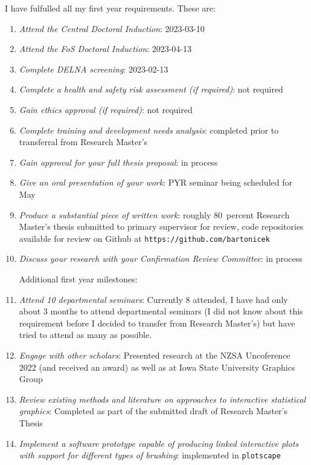 \documentclass[12pt,a4paper]{article}
\begin{document}
I have fulfulled all my first year requirements. These are:

\begin{enumerate}

\item \textit{Attend the Central Doctoral Induction}: 2023-03-10
\item \textit{Attend the FoS Doctoral Induction}: 2023-04-13
\item \textit{Complete DELNA screening}: 2023-02-13
\item \textit{Complete a health and safety risk assessment (if required)}: not required
\item \textit{Gain ethics approval (if required)}: not required
\item \textit{Complete training and development needs analysis}: completed prior to transferral from Research Master's
\item \textit{Gain approval for your full thesis proposal}: in process
\item \textit{Give an oral presentation of your work}: PYR seminar being scheduled for May
\item \textit{Produce a substantial piece of written work}: roughly 80~percent Research Master's thesis submitted to primary supervisor for review, 
code repositories available for review on Github at \texttt{https://github.com/bartonicek}
\item \textit{Discuss your research with your Confirmation Review Committee}: in process \newline \newline

Additional first year milestones:

\item \textit{Attend 10 departmental seminars}: Currently 8 attended, I have had only about 3 months to attend departmental seminars (I did not know about this requirement before I decided to transfer from Research Master's) but have tried to attend as many as possible.
\item \textit{Engage with other scholars}: Presented research at the NZSA Uncoference 2022 (and received an award) as well as at Iowa State University Graphics Group
\item \textit{Review existing methods and literature on approaches to interactive statistical graphics}: Completed as part of the submitted draft of Research Master's Thesis
\item \textit{Implement a software prototype capable of producing linked interactive plots with support for different types of brushing}: implemented in \texttt{plotscape}


\end{enumerate}
\end{document}
